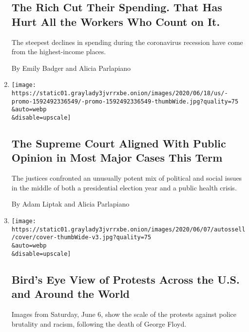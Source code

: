 \begin{enumerate}
  \hypertarget{the-rich-cut-their-spending-that-has-hurt-all-the-workers-who-count-on-it}{%
  \subsection{The Rich Cut Their Spending. That Has Hurt All the Workers
  Who Count on
  It.}\label{the-rich-cut-their-spending-that-has-hurt-all-the-workers-who-count-on-it}}

  The steepest declines in spending during the coronavirus recession
  have come from the highest-income places.

  By Emily Badger and Alicia Parlapiano
\item
  \href{/interactive/2020/06/15/us/supreme-court-major-cases-2020.html}{}

  \texttt{[image: https://static01.graylady3jvrrxbe.onion/images/2020/06/18/us/-promo-1592492336549/-promo-1592492336549-thumbWide.jpg?quality=75\\\&auto=webp\\\&disable=upscale]}

  \hypertarget{the-supreme-court-aligned-with-public-opinion-in-most-major-cases-this-term}{%
  \subsection{The Supreme Court Aligned With Public Opinion in Most
  Major Cases This
  Term}\label{the-supreme-court-aligned-with-public-opinion-in-most-major-cases-this-term}}

  The justices confronted an unusually potent mix of political and
  social issues in the middle of both a presidential election year and a
  public health crisis.

  By Adam Liptak and Alicia Parlapiano
\item
  \href{/interactive/2020/06/07/us/george-floyd-protest-aerial-photos.html}{}

  \texttt{[image: https://static01.graylady3jvrrxbe.onion/images/2020/06/07/autossell/cover/cover-thumbWide-v3.jpg?quality=75\\\&auto=webp\\\&disable=upscale]}

  \hypertarget{birds-eye-view-of-protests-across-the-us-and-around-the-world}{%
  \subsection{Bird's Eye View of Protests Across the U.S. and Around the
  World}\label{birds-eye-view-of-protests-across-the-us-and-around-the-world}}

  Images from Saturday, June 6, show the scale of the protests against
  police brutality and racism, following the death of George Floyd.


\end{enumerate}
